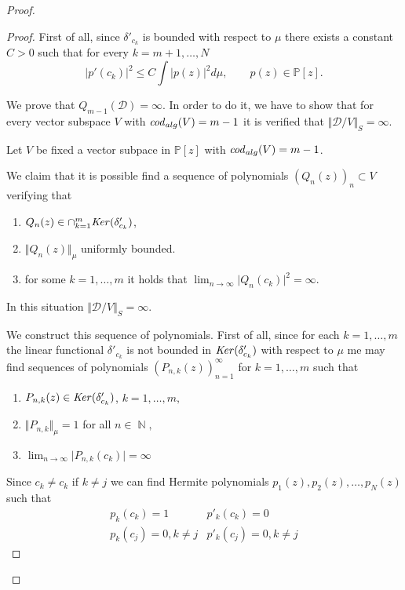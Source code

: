 \documentclass[12pt]{amsart}
\theoremstyle{definition}
\theoremstyle{plain}
\theoremstyle{remark}
\DeclareMathOperator{\NN}{\mathbb N}
\begin{document}
\begin{proof}
\begin{proof} First of all, since $\delta'_{c_{k}}$ is bounded with respect to $\mu$ there exists a constant  $C>0$ such that for every $k=m+1,\dots,N$
$$
\vert p'(c_k)\vert^2 \leq C \int \vert p(z) \vert^2 d\mu, \qquad p(z)\in \mathbb{P}[z].
$$ 



\noindent We  prove that $Q_{m-1}(\mathcal{D})=\infty$. In order to do it, we have to show that for every vector subspace $V$ with 
${\it cod}_{alg}(V)=m-1$ it is verified that $\Vert \mathcal{D}/V \Vert_S = \infty.$

\noindent Let $V$ be  fixed a vector subpace in $\mathbb{P}[z]$ with ${\it cod}_{alg}(V)=m-1$. 

\medskip
\noindent We claim that it is possible find a  sequence of polynomials $(Q_n(z))_n \subset V$ verifying that 
\begin{enumerate}
    \item $Q_n(z) \in \cap_{k=1}^m  {\it Ker}(\delta'_{c_k})$,
    \item $\Vert Q_n(z)\Vert_{\mu}$ uniformly bounded. 
    \item for some $k=1,\dots,m $ it holds that   
    $
\displaystyle{\lim_{n\to \infty} 
\vert Q_n
(c_k)\vert^2=\infty}
 .$ 
\end{enumerate}

\noindent In this situation $\Vert \mathcal{D}/V\Vert_S=\infty.$ 

\bigskip
\noindent We construct this sequence of polynomials. First of all, since for each $k=1,\dots, m$ the linear functional $\delta'_{c_k}$ is not bounded in ${\it Ker}(\delta'_{c_k})$ with respect to $\mu$ me may find   sequences of polynomials $(P_{n,k}(z))_{n=1}^{\infty}$ for $k=1,\dots,m$ such that 
\begin{enumerate}
       \item $P_{n,k}(z) \in {\it Ker}(\delta'_{c_k})$,  $k=1,\dots,m,$
    \item $\Vert P_{n,k} \Vert_\mu=1$ for all $n\in \NN,$ 
    \item $\displaystyle{\lim_{n\to \infty}  \vert P_{n,k}(c_k)\vert = \infty}$
\end{enumerate} 
\noindent Since  $c_k\neq c_k$ if $k\neq j$ we can find Hermite polynomials $p_1(z),p_2(z), \dots,p_N(z)$ such that 
$$
\begin{array}{cc}
   p_k(c_k)=1  &  p'_k(c_k)=0\\
   p_k(c_j)=0, k\neq j  & p'_k(c_j)=0, k\neq j   
\end{array}   
$$




\end{proof}
\end{proof}
\end{document}
